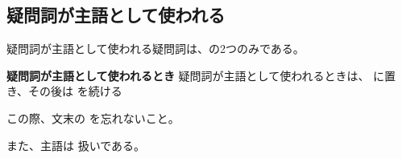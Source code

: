 \subsection{疑問詞が主語として使われる}
    疑問詞が主語として使われる疑問詞は、の2つのみである。

    \begin{theorembox}{\textbf{疑問詞が主語として使われるとき}}
        疑問詞が主語として使われるときは、 に置き、その後は  を続ける

        この際、文末の  を忘れないこと。

        また、主語は  扱いである。
    \end{theorembox}
    \vspace{1em}

